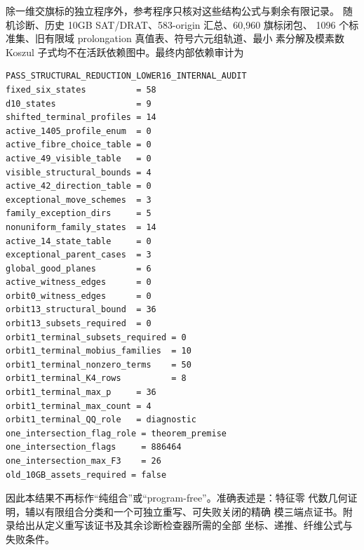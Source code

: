除一维交旗标的独立程序外，参考程序只核对这些结构公式与剩余有限记录。
随机诊断、历史 10GB SAT/DRAT、583-origin 汇总、60,960 旗标闭包、
1096 个标准集、旧有限域 prolongation 真值表、符号六元组轨道、最小
素分解及模素数 Koszul 子式均不在活跃依赖图中。最终内部依赖审计为
\begin{verbatim}
PASS_STRUCTURAL_REDUCTION_LOWER16_INTERNAL_AUDIT
fixed_six_states          = 58
d10_states                = 9
shifted_terminal_profiles = 14
active_1405_profile_enum  = 0
active_fibre_choice_table = 0
active_49_visible_table   = 0
visible_structural_bounds = 4
active_42_direction_table = 0
exceptional_move_schemes  = 3
family_exception_dirs     = 5
nonuniform_family_states  = 14
active_14_state_table     = 0
exceptional_parent_cases  = 3
global_good_planes        = 6
active_witness_edges      = 0
orbit0_witness_edges      = 0
orbit13_structural_bound  = 36
orbit13_subsets_required  = 0
orbit1_terminal_subsets_required = 0
orbit1_terminal_mobius_families  = 10
orbit1_terminal_nonzero_terms    = 50
orbit1_terminal_K4_rows          = 8
orbit1_terminal_max_p     = 36
orbit1_terminal_max_count = 4
orbit1_terminal_QQ_role   = diagnostic
one_intersection_flag_role = theorem_premise
one_intersection_flags     = 886464
one_intersection_max_F3    = 26
old_10GB_assets_required = false
\end{verbatim}
因此本结果不再标作“纯组合”或“program-free”。准确表述是：特征零
代数几何证明，辅以有限组合分类和一个可独立重写、可失败关闭的精确
模三端点证书。附录给出从定义重写该证书及其余诊断检查器所需的全部
坐标、递推、纤维公式与失败条件。
